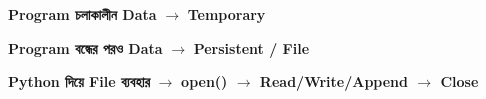 \begin{rememberbox}
\begin{center}
\medskip

\textbf{Program চলাকালীন Data}
\(\longrightarrow\)
\textbf{Temporary}

\qquad

\textbf{Program বন্ধের পরও Data}
\(\longrightarrow\)
\textbf{Persistent / File}

\medskip

\textbf{Python দিয়ে File ব্যবহার}
\(\longrightarrow\)
\textbf{\textenglish{\ttfamily open()} \(\rightarrow\) Read/Write/Append \(\rightarrow\) Close}

\end{center}

\end{rememberbox}

\small


